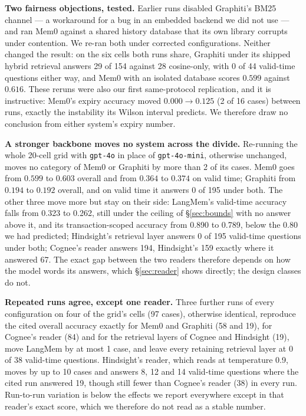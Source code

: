\documentclass[conference]{IEEEtran}
\begin{document}
\textbf{Two fairness objections, tested.} Earlier runs disabled Graphiti's BM25
channel --- a workaround for a bug in an embedded backend we did not use --- and
ran Mem0 against a shared history database that its own library corrupts under
contention. We re-ran both under corrected configurations. Neither changed the
result: on the six cells both runs share, Graphiti under its shipped hybrid
retrieval answers 29 of 154 against 28 cosine-only, with 0 of 44 valid-time
questions either way, and Mem0 with an isolated database scores $0.599$ against
$0.616$. These reruns were also our
first same-protocol replication, and it is instructive: Mem0's expiry accuracy
moved $0.000 \to 0.125$ (2 of 16 cases) between runs, exactly the instability its
Wilson interval predicts. We therefore draw no conclusion from either system's
expiry number.

\textbf{A stronger backbone moves no system across the divide.} Re-running the
whole 20-cell grid with \texttt{gpt-4o} in place of \texttt{gpt-4o-mini},
otherwise unchanged, moves no category of Mem0 or Graphiti by more than 2 of its
cases. Mem0 goes from $0.599$ to $0.603$ overall and from $0.364$ to $0.374$ on
valid time; Graphiti from $0.194$ to $0.192$ overall, and on valid time it
answers 0 of 195 under both. The other three move more but stay on their side:
LangMem's valid-time accuracy falls from 0.323 to 0.262, still under the ceiling
of \S\ref{sec:bounds} with no answer above it, and its transaction-scoped
accuracy from 0.890 to 0.789, below the 0.80 we had predicted; Hindsight's
retrieval layer answers 0 of 195 valid-time questions under both; Cognee's
reader answers 194, Hindsight's 159 exactly where it answered 67. The exact gap
between the two readers therefore depends on how the model words its answers,
which \S\ref{sec:reader} shows directly; the design classes do not.

\textbf{Repeated runs agree, except one reader.} Three further runs of every
configuration on four of the grid's cells (97 cases), otherwise identical,
reproduce the cited overall accuracy exactly for Mem0 and Graphiti (58 and 19),
for Cognee's reader (84) and for the retrieval layers of Cognee and Hindsight
(19), move LangMem by at most 1 case, and leave every retaining retrieval layer
at 0 of 38 valid-time questions. Hindsight's reader, which reads at temperature 0.9, moves
by up to 10 cases and answers 8, 12 and 14 valid-time questions where the cited
run answered 19, though still fewer than Cognee's reader (38) in every run.
Run-to-run variation is below the effects we report everywhere except in that
reader's exact score, which we therefore do not read as a stable number.
\end{document}
